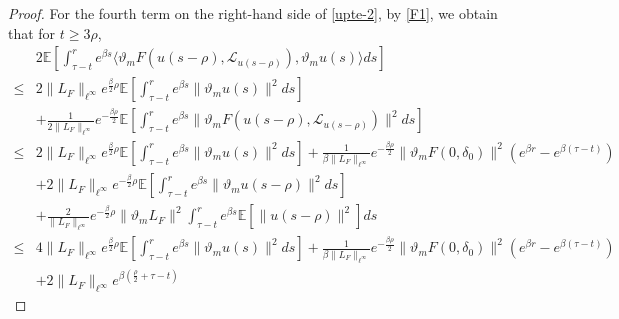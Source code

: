 \documentclass[11pt]{article}
\numberwithin{equation}{section}
\theoremstyle{plain}
\begin{document}
\begin{proof}
 For the fourth term on the right-hand side of \eqref{upte-2},
 by \eqref{F1}, we obtain that for $t \ge 3\rho$,
 \begin{align}\label{upte-6}
        & 2 \mathbb{E}
                 \left[ \int_{\tau-t}^{r} e^{\beta s}
                              \langle \vartheta_m F(u(s-\rho), \mathcal{L}_{u(s-\rho)}),
                                      \vartheta_m u(s)
                              \rangle ds
                 \right]  \nonumber\\
   \le & 2 \|L_{F}\|_{\ell^\infty} e^{\frac{\beta}{2} \rho}
          \mathbb{E}
            \left[ \int_{\tau-t}^{r} e^{\beta s} \|\vartheta_m u(s)\|^2 ds
            \right]  \nonumber\\
        & + \frac{1}{ 2 \|L_{F}\|_{\ell^\infty} } e^{-\frac{\beta \rho}{2} }
            \mathbb{E}
               \left[ \int_{\tau-t}^{r} e^{\beta s}
                           \| \vartheta_m F(u(s-\rho),\mathcal{L}_{u(s-\rho)})\|^2 ds
               \right]  \nonumber\\
   \le & 2 \|L_{F}\|_{\ell^\infty} e^{\frac{\beta}{2} \rho}
             \mathbb{E}
                    \left[ \int_{\tau-t}^{r} e^{\beta s} \|\vartheta_m u(s)\|^2 ds
                    \right]
             + \frac{1}{\beta \|L_{F}\|_{\ell^\infty} } 
                     e^{-\frac{\beta \rho}{2} } 
                          \|\vartheta_m F(0,\delta_0)\|^2
                               (e^{\beta r} - e^{\beta(\tau-t)})  \nonumber\\
        & + 2 \|L_{F}\|_{\ell^\infty} e^{-\frac{\beta}{2} \rho}
            \mathbb{E}
               \left[ \int_{\tau-t}^{r} e^{\beta s} \|\vartheta_m u(s-\rho)\|^2 ds 
               \right]  \nonumber\\
        & + \frac{2}{\|L_{F}\|_{\ell^\infty} } 
                   e^{- \frac{\beta}{2} \rho} \|\vartheta_m L_{F}\|^2
                           \int_{\tau-t}^{r} e^{\beta s}
                               \mathbb{E} \left[ \|u(s-\rho)\|^2 \right] ds  \nonumber\\
   \le & 4 \|L_{F}\|_{\ell^\infty} e^{\frac{\beta}{2} \rho}
               \mathbb{E}
                      \left[ \int_{\tau-t}^{r} e^{\beta s} \|\vartheta_m u(s)\|^2 ds
                      \right]
           + \frac{1}{\beta \|L_{F}\|_{\ell^\infty} } 
                  e^{- \frac{\beta \rho}{2} } 
                           \|\vartheta_m F(0,\delta_0)\|^2
                                 (e^{\beta r} - e^{\beta(\tau-t)})  \nonumber\\
        & + 2 \|L_{F}\|_{\ell^\infty} e^{\beta(\frac{\rho}{2}+\tau-t) }

\end{align}
\end{proof}
\end{document}
